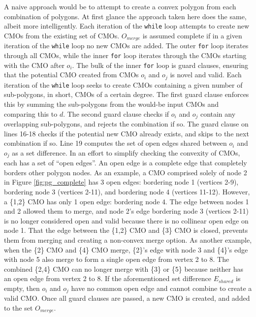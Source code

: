 A naive approach would be to attempt to create a convex polygon from each combination of polygons.
At first glance the approach taken here does the same, albeit more intelligently.
Each iteration of the \verb|while| loop attempts to create new CMOs from the existing set of CMOs.
$O_{merge}$ is assumed complete if in a given iteration of the \verb|while| loop no new CMOs are added.
The outer \verb|for| loop iterates through all CMOs, while the inner \verb|for| loop iterates through the CMOs starting with the CMO after $o_i$.
The bulk of the inner \verb|for| loop is guard clauses, ensuring that the potential CMO created from CMOs $o_i$ and $o_j$ is novel and valid.
Each iteration of the \verb|while| loop seeks to create CMOs containing a given number of sub-polygons, in short, CMOs of a certain degree.
The first guard clause enforces this by summing the sub-polygons from the would-be input CMOs and comparing this to $d$.
The second guard clause checks if $o_i$ and $o_j$ contain any overlapping sub-polygons, and rejects the combination if so.
The guard clause on lines 16-18 checks if the potential new CMO already exists, and skips to the next combination if so.
Line 19 computes the set of open edges shared between $o_i$ and $o_j$ as a set difference.
In an effort to simplify checking the convexity of CMOs, each has a set of ``open edges''.
An open edge is a complete edge that completely borders other polygon nodes.
As an example, a CMO comprised solely of node 2 in Figure \ref{fig:pg_complete} has 3 open edges: bordering node 1 (vertices 2-9), bordering node 3 (vertices 2-11), and bordering node 4 (vertices 11-12).
However, a \{1,2\} CMO has only 1 open edge: bordering node 4.
The edge between nodes 1 and 2 allowed them to merge, and node 2's edge bordering node 3 (vertices 2-11) is no longer considered open and valid because there is no collinear open edge on node 1.
That the edge between the \{1,2\} CMO and \{3\} CMO is closed, prevents them from merging and creating a non-convex merge option.
As another example, when the \{2\} CMO and \{4\} CMO merge, \{2\}'s edge with node 3 and \{4\}'s edge with node 5 also merge to form a single open edge from vertex 2 to 8.
The combined \{2,4\} CMO can no longer merge with \{3\} or \{5\} because neither has an open edge from vertex 2 to 8.
If the aforementioned set difference $E_{shared}$ is empty, then $o_i$ and $o_j$ have no common open edge and cannot combine to create a valid CMO.
Once all guard clauses are passed, a new CMO is created, and added to the set $O_{merge}$.

